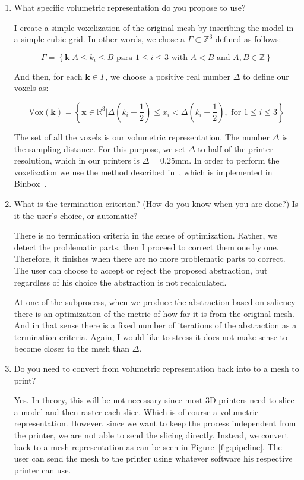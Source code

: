 \begin{enumerate}
	\item What specific volumetric representation do you propose to use?
	
	I create a simple voxelization of the original mesh by inscribing the model in a simple cubic grid. In other words, we chose a $\Gamma \subset \mathbb{Z}^3$ defined as follows: 
	
		$$\Gamma = \left\lbrace \textbf{k} | A \leq k_i \leq B \text{ para } 1 \leq i \leq 3 \text{ with } A < B \text{ and } A, B \in \mathbb{Z} 	\right\rbrace $$
		
	And then, for each $\textbf{k} \in \Gamma$, we choose a positive real number $\Delta$ to define our voxels as:
	
	$$\text{Vox} (\textbf{k}) = \left\lbrace \textbf{x} \in \mathbb{R}^3 | \Delta \left(  k_i - \dfrac{1}{2} \right) \leq x_i < \Delta \left(  k_i + \dfrac{1}{2} \right)  , \text{ for } 1 \leq i \leq 3 \right\rbrace $$
	
	The set of all the voxels is our volumetric representation. The number $\Delta$ is the sampling distance. For this purpose, we set $\Delta$ to half of the printer resolution, which in our printers is $\Delta = 0.25$mm. In order to perform the voxelization we use the method described in~\cite{Nooruddin2003}, which is implemented in Binbox~\cite{Min2016}.
	
	\item What is the termination criterion? (How do you know when you are done?) Is it the user's choice, or automatic?
	
	There is no termination criteria in the sense of optimization. Rather, we detect the problematic parts, then I proceed to correct them one by one. Therefore, it finishes when there are no more problematic parts to correct. The user can choose to accept or reject the proposed abstraction, but regardless of his choice the abstraction is not recalculated.
	
	At one of the subprocess, when we produce the abstraction based on saliency there is an optimization of the metric of how far it is from the original mesh. And in that sense there is a fixed number of iterations of the abstraction as a termination criteria. Again, I would like to stress it does not make sense to become closer to the mesh than $\Delta$.

  \item Do you need to convert from volumetric representation back into to a mesh to print?
	
	Yes. In theory, this will be not necessary since most 3D printers need to slice a model and then raster each slice. Which is of course a volumetric representation. However, since we want to keep the process independent from the printer, we are not able to send the slicing directly. Instead, we convert back to a mesh representation as can be seen in Figure~\ref{fig:pipeline}. The user can send the mesh to the printer using whatever software his respective printer can use.
	

\end{enumerate}
